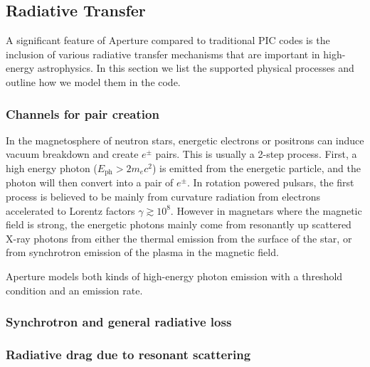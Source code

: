 \subsection{Radiative Transfer}
\label{sec:radiative-transfer}

A significant feature of Aperture compared to traditional PIC codes is the
inclusion of various radiative transfer mechanisms that are important in
high-energy astrophysics. In this section we list the supported physical
processes and outline how we model them in the code.

\subsubsection{Channels for pair creation}
\label{sec:instant-pair}

In the magnetosphere of neutron stars, energetic electrons or positrons can
induce vacuum breakdown and create $e^{\pm}$ pairs. This is usually a 2-step
process. First, a high energy photon ($E_\mathrm{ph} > 2m_{e}c^2$) is emitted
from the energetic particle, and the photon will then convert into a pair of
$e^{\pm}$. In rotation powered pulsars, the first process is believed to be
mainly from curvature radiation from electrons accelerated to Lorentz factors
$\gamma \gtrsim 10^{8}$. %
However in magnetars where the magnetic field is strong, the energetic photons
mainly come from resonantly up scattered X-ray photons from either the thermal
emission from the surface of the star, or from synchrotron emission of the
plasma in the magnetic field.

Aperture models both kinds of high-energy photon emission with a threshold
condition and an emission rate.


\subsubsection{Synchrotron and general radiative loss}
\label{sec:synchrotron-loss}

\subsubsection{Radiative drag due to resonant scattering}
\label{sec:resonant-scattering}



